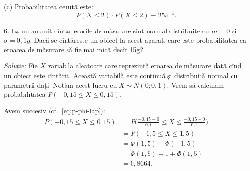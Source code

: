 \documentclass[12pt,a4paper]{article}
\theoremstyle{dotless}
\theoremstyle{dotlessdr}
\begin{document}
(c) Probabilitatea cerută este:
\[
  P(X \leq 2) \cdot P(X \leq 2) = 25e^{-4}.
\]

\newpage

6. La un anumit cîntar erorile de măsurare sînt normal distribuite cu $ m = 0 $ și
$ \sigma = 0,1 g $. Dacă se cîntărește un obiect la acest aparat, care este
probabilitatea ca eroarea de măsurare să fie mai mică decît 15g?

\emph{Soluție:} Fie $ X $ variabila aleatoare care reprezintă eroarea de măsurare
dată cînd un obiect este cîntărit. Această variabilă este continuă și distribuită
normal cu parametrii dați. Notăm acest lucru cu $ X \sim N(0; 0,1) $.
Vrem să calculăm probabilitatea $ P(-0,15 \leq X \leq 0,15) $.

Avem succesiv (cf.~\eqref{eq:p-phi-lap}):
\begin{align*}
  P(-0,15 \leq X \leq 0,15) &= P\Big( \frac{-0,15 - 0}{0,1} \leq X \leq \frac{-0,15 + 0}{0,1} \Big) \\
                            &= P(-1,5 \leq X \leq 1,5) \\
                            &= \Phi(1,5) - \Phi(-1,5) \\
                            &= \Phi(1,5) - 1 + \Phi(1,5) \\
                            &= 0,8664.
\end{align*}
\end{document}
